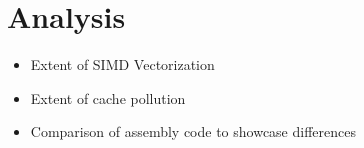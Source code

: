  
\cleardoubleoddpage
\chapter{Analysis}
\label{sec:analysis}

\begin{itemize}
  \item Extent of SIMD Vectorization
  \item Extent of cache pollution
  \item Comparison of assembly code to showcase differences
\end{itemize}

